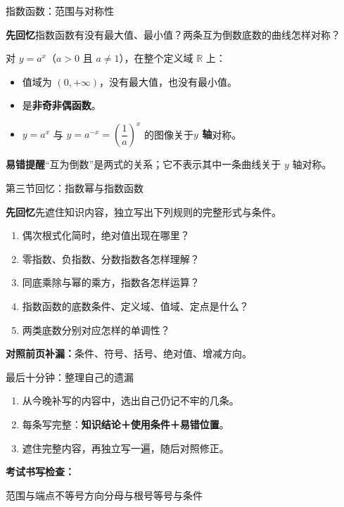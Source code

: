 \documentclass[UTF8,10pt,aspectratio=169,handout]{ctexbeamer}
\newcommand{\Recall}[1]{\par\noindent\textcolor{KnowledgeBlue}{\textbf{先回忆}\quad #1}\par\vspace{0.3cm}}
\newcommand{\Pitfall}[1]{\par\vspace{0.22cm}\noindent\textbf{易错提醒}\quad #1\par}
\begin{document}
\begin{frame}[t]{指数函数：范围与对称性}
\Recall{指数函数有没有最大值、最小值？两条互为倒数底数的曲线怎样对称？}
\pause
对 $y=a^x$（$a>0$ 且 $a\ne1$），在整个定义域 $\mathbb R$ 上：
\begin{itemize}
\item 值域为 $(0,+\infty)$，没有最大值，也没有最小值。
\item 是\textbf{非奇非偶函数}。
\item $y=a^x$ 与 $y=a^{-x}=\left(\dfrac1a\right)^x$ 的图像关于\textbf{$y$ 轴}对称。
\end{itemize}
\Pitfall{“互为倒数”是两式的关系；它不表示其中一条曲线关于 $y$ 轴对称。}
\end{frame}

\begin{frame}[t]{第三节回忆：指数幂与指数函数}
\Recall{先遮住知识内容，独立写出下列规则的完整形式与条件。}
\begin{enumerate}
\item 偶次根式化简时，绝对值出现在哪里？
\item 零指数、负指数、分数指数各怎样理解？
\item 同底乘除与幂的乘方，指数各怎样运算？
\item 指数函数的底数条件、定义域、值域、定点是什么？
\item 两类底数分别对应怎样的单调性？
\end{enumerate}
\pause
\par\vspace{0.2cm}\textbf{对照前页补漏：}条件、符号、括号、绝对值、增减方向。
\end{frame}


\begin{frame}[t]{最后十分钟：整理自己的遗漏}
\begin{enumerate}
\item 从今晚补写的内容中，选出自己仍记不牢的几条。
\item 每条写完整：\textbf{知识结论＋使用条件＋易错位置}。
\item 遮住完整内容，再独立写一遍，随后对照修正。
\end{enumerate}
\par\vspace{0.55cm}
\textbf{考试书写检查：}\par\vspace{0.25cm}
范围与端点\quad 不等号方向\quad 分母与根号\quad 等号与条件
\end{frame}
\end{document}
